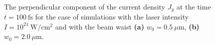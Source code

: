 \begin{figure}[h!]
	\centering
	\\[2mm]
	\caption{The perpendicular component of the current density $ J_{y} $ at the time $ t = 100 \ \mathrm{fs} $ for the case of simulations with the laser intensity $ I = 10^{21} \ \mathrm{W/cm^2} $ and with the beam waist \textbf{(a)} $ w_0 = 0.5 \ \mu\mathrm{m} $, \textbf{(b)} $ w_0 = 2.0 \ \mu\mathrm{m} $.}
	\label{fig:18}
\end{figure}

